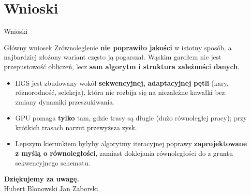 \documentclass[aspectratio=169,11pt]{beamer}
\begin{document}
\section{Wnioski}
\begin{frame}{Wnioski}
  \begin{block}{Główny wniosek}
    Zrównoleglenie \textbf{nie poprawiło jakości} w istotny sposób, a najbardziej złożony wariant często ją pogarszał. Wąskim gardłem nie jest przepustowość obliczeń, lecz \textbf{sam algorytm i struktura zależności danych}.
  \end{block}
  \vfill
  \begin{itemize}
    \item HGS jest zbudowany wokół \textbf{sekwencyjnej, adaptacyjnej pętli} (kary, różnorodność, selekcja), która nie rozbija się na niezależne kawałki bez zmiany dynamiki przeszukiwania.
    \item GPU pomaga \textbf{tylko} tam, gdzie trasy są długie (dużo równoległej pracy); przy krótkich trasach narzut przewyższa zysk.
    \item Lepszym kierunkiem byłyby algorytmy iteracyjnej poprawy \textbf{zaprojektowane z myślą o równoległości}, zamiast doklejania równoległości do z gruntu sekwencyjnego schematu.
  \end{itemize}
\end{frame}

\begin{frame}[plain]
  \vfill
  \centering
  {\color{accent}\Large\textbf{Dziękujemy za uwagę.}}\\[1em]
  \footnotesize Hubert Blonowski \quad\textbullet\quad Jan Zaborski
  \vfill
\end{frame}
\end{document}
